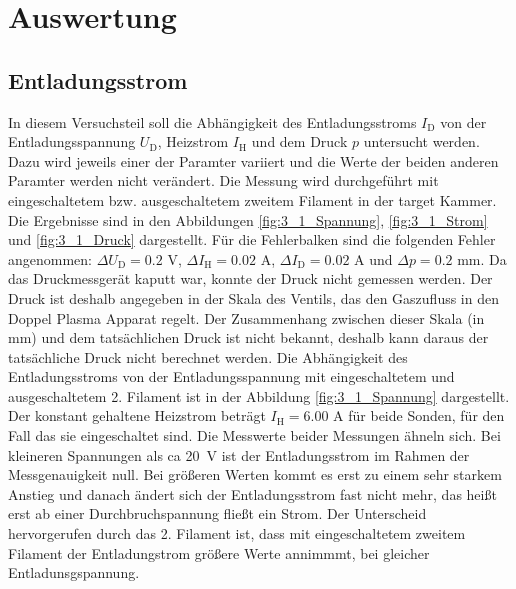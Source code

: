 \section{Auswertung}
\subsection{Entladungsstrom}\label{sec:Entladungsstrom}
In diesem Versuchsteil soll die Abhängigkeit des Entladungsstroms  $I_{\mathrm{D}}$ von der Entladungsspannung $U_{\mathrm{D}}$, Heizstrom $I_{\mathrm{H}}$ und dem Druck $p$ untersucht werden. Dazu wird jeweils einer der Paramter variiert und die Werte der beiden anderen Paramter werden nicht verändert. Die Messung wird durchgeführt mit eingeschaltetem bzw. ausgeschaltetem  zweitem Filament in der target Kammer. Die Ergebnisse sind in den Abbildungen \ref{fig:3_1_Spannung}, \ref{fig:3_1_Strom} und \ref{fig:3_1_Druck} dargestellt. Für die Fehlerbalken sind die folgenden Fehler angenommen: $\Delta U_{\mathrm{D}} = 0.2 $ V, $\Delta I_{\mathrm{H}} = 0.02$ A, $\Delta I_{\mathrm{D}} = 0.02$ A und  $\Delta p = 0.2 $ mm. Da das Druckmessgerät kaputt war, konnte der Druck nicht gemessen werden. Der Druck ist deshalb angegeben in der Skala des Ventils, das den Gaszufluss in den Doppel Plasma Apparat regelt. Der Zusammenhang zwischen dieser Skala (in mm) und dem tatsächlichen Druck ist nicht bekannt, deshalb kann daraus der tatsächliche Druck nicht berechnet werden. Die Abhängigkeit des Entladungsstroms von der Entladungsspannung mit eingeschaltetem und ausgeschaltetem 2. Filament ist in der Abbildung \ref{fig:3_1_Spannung} dargestellt. Der konstant gehaltene Heizstrom beträgt $ I_{\mathrm{H}} =6.00$ A für beide Sonden, für den Fall das sie eingeschaltet sind. Die Messwerte beider Messungen ähneln sich. Bei kleineren Spannungen als ca \SI{20}{V} ist der Entladungsstrom im Rahmen der Messgenauigkeit null.  Bei größeren Werten kommt es erst zu einem sehr starkem Anstieg und danach ändert sich der Entladungsstrom fast nicht mehr, das heißt erst ab einer Durchbruchspannung fließt ein Strom. Der Unterscheid hervorgerufen durch das 2. Filament ist, dass mit eingeschaltetem zweitem Filament der Entladungstrom größere Werte annimmmt, bei gleicher Entladunsgspannung.  
